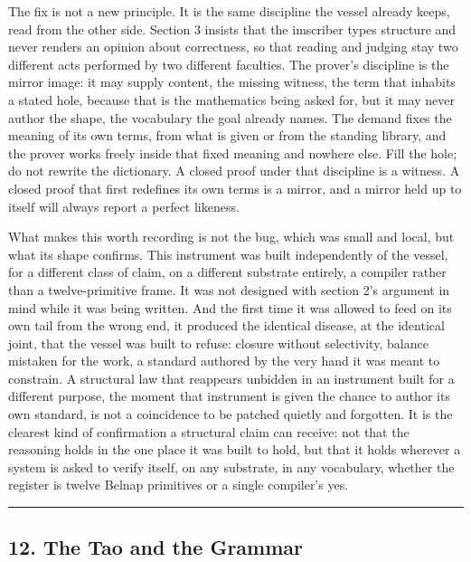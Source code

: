 The fix is not a new principle. It is the same discipline the vessel
already keeps, read from the other side. Section 3 insists that the
imscriber types structure and never renders an opinion about
correctness, so that reading and judging stay two different acts
performed by two different faculties. The prover's discipline is the
mirror image: it may supply content, the missing witness, the term that
inhabits a stated hole, because that is the mathematics being asked for,
but it may never author the shape, the vocabulary the goal already
names. The demand fixes the meaning of its own terms, from what is given
or from the standing library, and the prover works freely inside that
fixed meaning and nowhere else. Fill the hole; do not rewrite the
dictionary. A closed proof under that discipline is a witness. A closed
proof that first redefines its own terms is a mirror, and a mirror held
up to itself will always report a perfect likeness.

What makes this worth recording is not the bug, which was small and
local, but what its shape confirms. This instrument was built
independently of the vessel, for a different class of claim, on a
different substrate entirely, a compiler rather than a twelve-primitive
frame. It was not designed with section 2's argument in mind while it
was being written. And the first time it was allowed to feed on its own
tail from the wrong end, it produced the identical disease, at the
identical joint, that the vessel was built to refuse: closure without
selectivity, balance mistaken for the work, a standard authored by the
very hand it was meant to constrain. A structural law that reappears
unbidden in an instrument built for a different purpose, the moment that
instrument is given the chance to author its own standard, is not a
coincidence to be patched quietly and forgotten. It is the clearest kind
of confirmation a structural claim can receive: not that the reasoning
holds in the one place it was built to hold, but that it holds wherever
a system is asked to verify itself, on any substrate, in any vocabulary,
whether the register is twelve Belnap primitives or a single compiler's
yes.

\begin{center}\rule{0.5\linewidth}{0.5pt}\end{center}

\hypertarget{the-tao-and-the-grammar}{%
\subsection{12. The Tao and the Grammar}\label{the-tao-and-the-grammar}}

